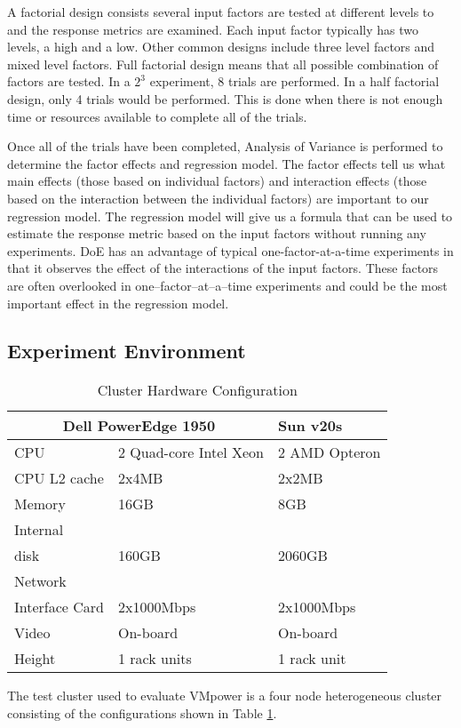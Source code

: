 \documentclass[times, 10pt,twocolumn]{article}
\begin{document}
A factorial design consists several input factors are tested at different
levels to and the response metrics are examined.  Each input factor typically
has two levels, a high and a low.  Other common designs include three level
factors and mixed level factors.  Full factorial design means that all
possible combination of factors are tested.  In a $2^{3}$ experiment, 8 trials
are performed.  In a half factorial design, only 4 trials would be performed.
This is done when there is not enough time or resources available to complete
all of the trials.

Once all of the trials have been completed, Analysis of Variance is performed
to determine the factor effects and regression model.  The factor effects tell
us what main effects (those based on individual factors) and interaction
effects (those based on the interaction between the individual factors) are
important to our regression model.  The regression model will give us a
formula that can be used to estimate the response metric based on the input
factors without running any experiments.  DoE has an advantage of typical
one-factor-at-a-time experiments in that it observes the effect of the
interactions of the input factors.  These factors are often overlooked in
one--factor--at--a--time experiments and could be the most important effect
in the regression model.

\subsection{Experiment Environment}
\label{sec:expdesign}
\begin{table}
  \centering
  \label{tab:hardware}
  \begin{tabular}{|l|l|l|}
    \hline
    \multicolumn{2}{c}{\bf{Dell PowerEdge 1950}}&Sun v20s\\  
    \hline
    CPU&2 Quad-core Intel Xeon &2 AMD Opteron\\
    \hline
    CPU L2 cache&2x4MB&2x2MB\\
    \hline
    Memory&16GB&8GB\\
    \hline
    Internal\\disk&160GB&2060GB\\
    \hline
    Network\\ Interface Card&2x1000Mbps&2x1000Mbps\\
    \hline
    Video&On-board&On-board \\
    \hline
    Height&1 rack units&1 rack unit\\
    \hline
  \end{tabular}
  \caption{Cluster Hardware Configuration}
\end{table}
The test cluster used to evaluate VMpower is a four node heterogeneous cluster
consisting of the configurations shown in Table \ref{tab:hardware}.
\end{document}
